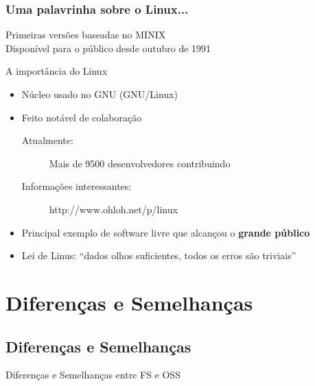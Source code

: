 \documentclass[xcolor=dvipsnames]{beamer}
\begin{document}
\begin{frame}
\frametitle{Uma palavrinha sobre o Linux...}
Primeiras versões baseadas no MINIX
\\[0.2cm]
Disponível para o público desde outubro de 1991\\[0.2cm]
  \begin{block}{A importância do Linux} 
  \begin{itemize}
  \item Núcleo usado no GNU (GNU/Linux) \vspace{0.1cm}
  \item Feito notável de colaboração 
  \begin{description}
  \item [Atualmente:] Mais de 9500 desenvolvedores contribuindo
  \item [Informações interessantes:] http://www.ohloh.net/p/linux
  \end{description}
\vspace{0.1cm}  \item Principal exemplo de software livre que alcançou o {\bf grande público}
\vspace{0.1cm}\pause
  \item Lei de Linus: ``dados olhos suficientes, todos os erros são triviais''
 
  \end{itemize}
  \end{block}
\end{frame}


\section{Diferenças e Semelhanças}	
\subsection{Diferenças e Semelhanças}	

\begin{frame}
\vspace{0.2cm}
\begin{center}
\Huge{Diferenças e Semelhanças entre FS e OSS}
\end{center}

\end{frame}
\end{document}
